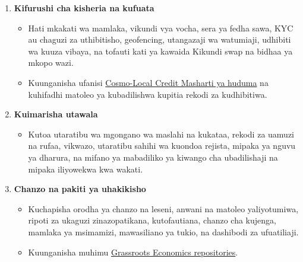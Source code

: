 \documentclass[11pt]{article}
\begin{document}
\begin{enumerate}[leftmargin=*]
\item \textbf{Kifurushi cha kisheria na kufuata}
\begin{itemize}[leftmargin=*]
\item Hati mkakati wa mamlaka, vikundi vya vocha, sera ya fedha sawa, KYC au chaguzi za uthibitisho, geofencing, utangazaji wa watumiaji, udhibiti wa kuuza vibaya, na tofauti kati ya kawaida Kikundi swap na bidhaa ya mkopo wazi.
\item Kuunganisha ufanisi \href{https://docs.cosmolocal.credit/sw/governance/terms}{Cosmo-Local Credit Masharti ya huduma} na kuhifadhi matoleo ya kubadilishwa kupitia rekodi za kudhibitiwa.
\end{itemize}
\item \textbf{Kuimarisha utawala}
\begin{itemize}[leftmargin=*]
\item Kutoa utaratibu wa mgongano wa maslahi na kukataa, rekodi za uamuzi na rufaa, vikwazo, utaratibu sahihi wa kuondoa rejista, mipaka ya nguvu ya dharura, na mifano ya mabadiliko ya kiwango cha ubadilishaji na mipaka iliyowekwa kwa wakati.
\end{itemize}
\item \textbf{Chanzo na pakiti ya uhakikisho}
\begin{itemize}[leftmargin=*]
\item Kuchapisha orodha ya chanzo na leseni, anwani na matoleo yaliyotumiwa, ripoti za ukaguzi zinazopatikana, kutofautiana, chanzo cha kujenga, mamlaka ya msimamizi, mawasiliano ya tukio, na dashibodi za ufuatiliaji.
\item Kuunganisha muhimu \href{https://github.com/grassrootseconomics}{Grassroots Economics repositories}.
\end{itemize}
\end{enumerate}
\end{document}
